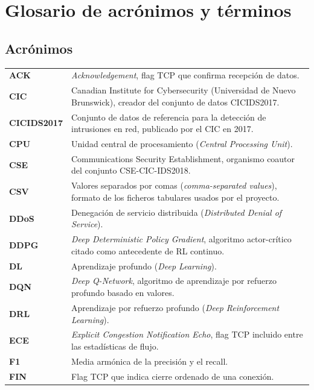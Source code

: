 \chapter*{Glosario de acrónimos y términos}

\section*{Acrónimos}

\begin{longtable}{@{}p{2.6cm}p{10.8cm}@{}}
\textbf{ACK} & \emph{Acknowledgement}, flag TCP que confirma recepción de datos. \\[2pt]
\textbf{CIC} & Canadian Institute for Cybersecurity (Universidad de Nuevo Brunswick), creador del conjunto de datos CICIDS2017. \\[2pt]
\textbf{CICIDS2017} & Conjunto de datos de referencia para la detección de intrusiones en red, publicado por el CIC en 2017. \\[2pt]
\textbf{CPU} & Unidad central de procesamiento (\emph{Central Processing Unit}). \\[2pt]
\textbf{CSE} & Communications Security Establishment, organismo coautor del conjunto CSE-CIC-IDS2018. \\[2pt]
\textbf{CSV} & Valores separados por comas (\emph{comma-separated values}), formato de los ficheros tabulares usados por el proyecto. \\[2pt]
\textbf{DDoS} & Denegación de servicio distribuida (\emph{Distributed Denial of Service}). \\[2pt]
\textbf{DDPG} & \emph{Deep Deterministic Policy Gradient}, algoritmo actor-crítico citado como antecedente de RL continuo. \\[2pt]
\textbf{DL} & Aprendizaje profundo (\emph{Deep Learning}). \\[2pt]
\textbf{DQN} & \emph{Deep Q-Network}, algoritmo de aprendizaje por refuerzo profundo basado en valores. \\[2pt]
\textbf{DRL} & Aprendizaje por refuerzo profundo (\emph{Deep Reinforcement Learning}). \\[2pt]
\textbf{ECE} & \emph{Explicit Congestion Notification Echo}, flag TCP incluido entre las estadísticas de flujo. \\[2pt]
\textbf{F1} & Media armónica de la precisión y el recall. \\[2pt]
\textbf{FIN} & Flag TCP que indica cierre ordenado de una conexión. \\[2pt]

\end{longtable}
